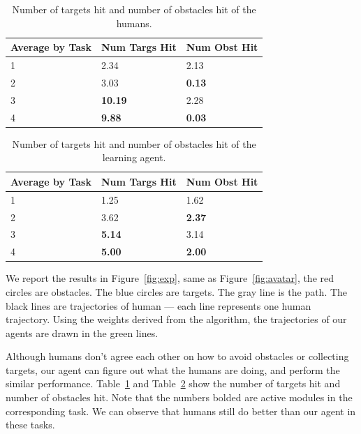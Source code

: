 \documentclass[11pt]{article} %
\begin{document}
\begin{table}[h!]
\centering
\begin{tabular}{| l| l| l |}
\hline
Average by Task & Num Targs Hit & Num Obst Hit\\
\hline
1 & 2.34 &  2.13\\
\hline
2 & 3.03 &  \bf{0.13}\\
\hline
3 & \bf{10.19} & 2.28\\
\hline
4 & \bf{9.88} &  \bf{0.03}\\
\hline
\end{tabular}
\caption{Number of targets hit and number of obstacles hit of the humans.}
\label{tb:human}
\end{table}

\begin{table}[h!]
\centering
\begin{tabular}{| l| l| l |}
\hline
Average by Task & Num Targs Hit & Num Obst Hit\\
\hline
1 & 1.25 & 1.62\\
\hline
2 & 3.62 & \bf{2.37}\\
\hline
3 & \bf{5.14} & 3.14\\
\hline
4 & \bf{5.00} & \bf{2.00}\\
\hline
\end{tabular}
\caption{Number of targets hit and number of obstacles hit of the learning agent.}
\label{tb:agent}
\end{table}

We report the results in Figure~\ref{fig:exp}, same as Figure~\ref{fig:avatar},
the red circles are obstacles. The blue circles are targets. The gray line is
the path. The black lines are trajectories of human --- each line represents one
human trajectory.
Using the weights derived from the algorithm, the trajectories of our agents are
drawn in the green lines.

Although humans don't agree each other on how to avoid obstacles or collecting
targets, our agent can figure out what the humans are doing, and perform the
similar performance. Table~\ref{tb:human} and Table~\ref{tb:agent} show the
number of targets hit and number of obstacles hit. Note that the numbers bolded
are active modules in the corresponding task. We can observe that humans still
do better than our agent in these tasks.
\end{document}
